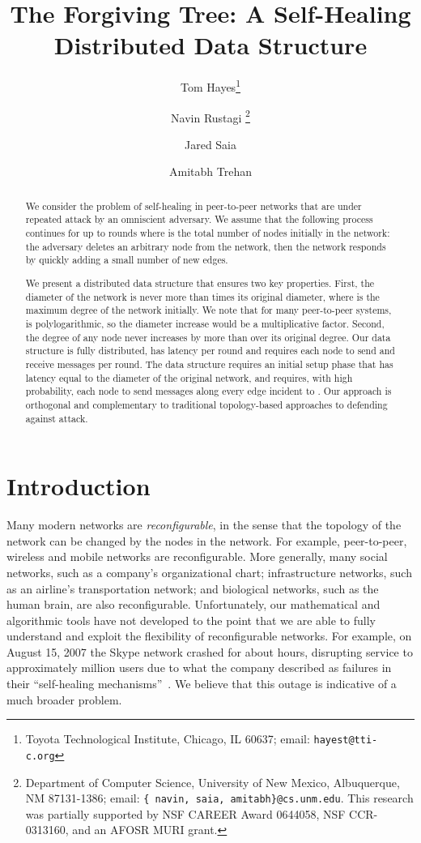 \documentclass[11pt]{article}
\title{The Forgiving Tree: A Self-Healing Distributed Data Structure}
\author{Tom Hayes\thanks{Toyota Technological Institute, Chicago, IL 60637;
email: {\tt hayest@tti-c.org}} 
\and Navin Rustagi \thanks{Department of Computer Science,  
University of New Mexico,  Albuquerque,  NM 87131-1386;
email: {\tt \{ navin, saia, amitabh\}@cs.unm.edu}. 
This research was partially supported by NSF CAREER Award 0644058,
NSF CCR-0313160, and an AFOSR MURI grant.} 
\and Jared Saia  \footnotemark[2] 
\and Amitabh Trehan  \footnotemark[2] }
\begin{document}
\date{}
\maketitle

\thispagestyle{empty}

\begin{abstract}
We consider the problem of self-healing in peer-to-peer networks that
are under repeated attack by an omniscient adversary.  We assume that
the following process continues for up to  rounds where  is the
total number of nodes initially in the network: the adversary deletes
an arbitrary node from the network, then the network responds by
quickly adding a small number of new edges.

We present a distributed data structure that ensures two key
properties.  First, the diameter of the network is never more than
 times its original diameter, where  is the
maximum degree of the network initially.  We note that for many
peer-to-peer systems,  is polylogarithmic, so the diameter
increase would be a  multiplicative factor.  Second,
the degree of any node never increases by more than  over its
original degree.  Our data structure is fully distributed, has 
latency per round and requires each node to send and receive 
messages per round.  The data structure requires an initial setup
phase that has latency equal to the diameter of the original network,
and requires, with high probability, each node  to send 
messages along every edge incident to .  Our approach is orthogonal
and complementary to traditional topology-based approaches to
defending against attack.
\end{abstract}

\section{Introduction}

Many modern networks are \emph{reconfigurable}, in the sense that the topology of the network can be changed by the
nodes in the network.  For example, peer-to-peer, wireless and mobile networks are reconfigurable.  More generally, many
social networks, such as a company's organizational chart; infrastructure networks, such as an airline's transportation
network; and biological networks, such as the human brain, are also reconfigurable.  Unfortunately, our mathematical and
algorithmic tools have not developed to the point that we are able to fully understand and exploit the flexibility of
reconfigurable networks.  For example, on August 15, 2007 the Skype network crashed for about  hours, disrupting
service to approximately  million users due to what the company described as failures in their ``self-healing
mechanisms''~\cite{garvey, fisher,malik, moore, ray, stone}.  We believe that this outage is indicative of a much broader
problem.
\end{document}

